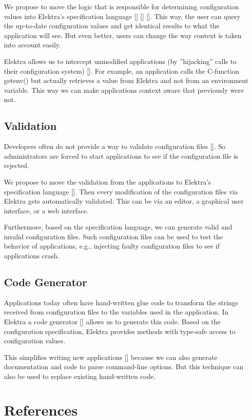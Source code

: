 We propose to move the logic that is responsible for determining configuration values into Elektra's specification language \mbox{[}\mbox{]} \mbox{[}\mbox{]} \mbox{[}\mbox{]}. This way, the user can query the up-\/to-\/date configuration values and get identical results to what the application will see. But even better, users can change the way context is taken into account easily.

Elektra allows us to intercept unmodified applications (by ''hijacking'' calls to their configuration system) \mbox{[}\mbox{]}. For example, an application calls the C-\/function getenv() but actually retrieves a value from Elektra and not from an environment variable. This way we can make applications context aware that previously were not.

\subsection*{Validation}

Developers often do not provide a way to validate configuration files \mbox{[}\mbox{]}. So administrators are forced to start applications to see if the configuration file is rejected.

We propose to move the validation from the applications to Elektra's specification language \mbox{[}\mbox{]}. Then every modification of the configuration files via Elektra gets automatically validated. This can be via an editor, a graphical user interface, or a web interface.

Furthermore, based on the specification language, we can generate valid and invalid configuration files. Such configuration files can be used to test the behavior of applications, e.\+g., injecting faulty configuration files to see if applications crash.

\subsection*{Code Generator}

Applications today often have hand-\/written glue code to transform the strings received from configuration files to the variables used in the application. In Elektra a code generator \mbox{[}\mbox{]} allows us to generate this code. Based on the configuration specification, Elektra provides methods with type-\/safe access to configuration values.

This simplifies writing new applications \mbox{[}\mbox{]} because we can also generate documentation and code to parse command-\/line options. But this technique can also be used to replace existing hand-\/written code.

\section*{References}